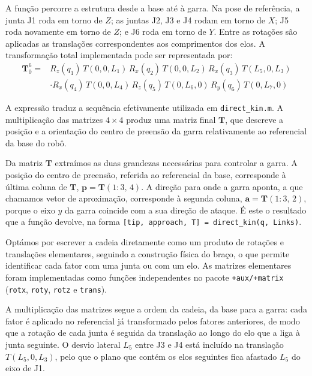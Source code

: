A função percorre a estrutura desde a base até à garra. Na pose de referência, a junta J1 roda em torno de $Z$; as juntas J2, J3 e J4 rodam em torno de $X$; J5 roda novamente em torno de $Z$; e J6 roda em torno de $Y$. Entre as rotações são aplicadas as translações correspondentes aos comprimentos dos elos. A transformação total implementada pode ser representada por:
\begin{equation*}
\begin{aligned}
\mathbf{T}_0^6 ={}& R_z(q_1)\,T(0,0,L_1)\,R_x(q_2)\,T(0,0,L_2)\,R_x(q_3)\,T(L_5,0,L_3)\\
&\cdot R_x(q_4)\,T(0,0,L_4)\,R_z(q_5)\,T(0,L_6,0)\,R_y(q_6)\,T(0,L_7,0)
\end{aligned}
\end{equation*}

A expressão traduz a sequência efetivamente utilizada em \texttt{direct\_kin.m}. A multiplicação das matrizes $4\times4$ produz uma matriz final $\mathbf{T}$, que descreve a posição e a orientação do centro de preensão da garra relativamente ao referencial da base do robô.

Da matriz $\mathbf{T}$ extraímos as duas grandezas necessárias para controlar a garra. A posição do centro de preensão, referida ao referencial da base, corresponde à última coluna de $\mathbf{T}$, $\mathbf{p}=\mathbf{T}(1\!:\!3,\,4)$. A direção para onde a garra aponta, a que chamamos vetor de aproximação, corresponde à segunda coluna, $\mathbf{a}=\mathbf{T}(1\!:\!3,\,2)$, porque o eixo $y$ da garra coincide com a sua direção de ataque. É este o resultado que a função devolve, na forma \texttt{[tip, approach, T] = direct\_kin(q, Links)}.

Optámos por escrever a cadeia diretamente como um produto de rotações e translações elementares, seguindo a construção física do braço, o que permite identificar cada fator com uma junta ou com um elo. As matrizes elementares foram implementadas como funções independentes no pacote \texttt{+aux/+matrix} (\texttt{rotx}, \texttt{roty}, \texttt{rotz} e \texttt{trans}).

A multiplicação das matrizes segue a ordem da cadeia, da base para a garra: cada fator é aplicado no referencial já transformado pelos fatores anteriores, de modo que a rotação de cada junta é seguida da translação ao longo do elo que a liga à junta seguinte. O desvio lateral $L_5$ entre J3 e J4 está incluído na translação $T(L_5,0,L_3)$, pelo que o plano que contém os elos seguintes fica afastado $L_5$ do eixo de J1.

